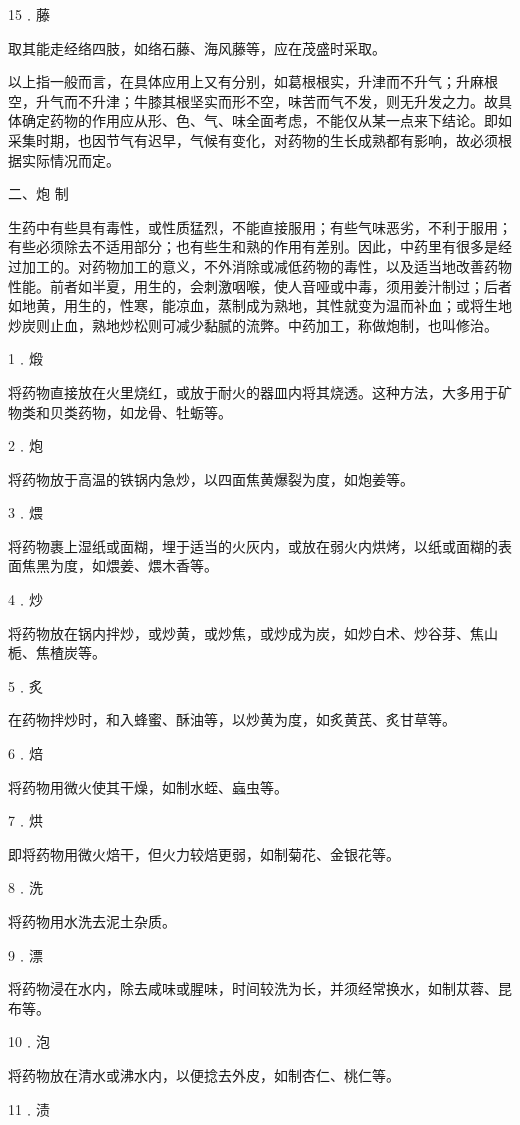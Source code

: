 \documentclass[12pt,UTF8]{ctexbook}
\begin{document}
15﹒藤

取其能走经络四肢，如络石藤、海风藤等，应在茂盛时采取。

以上指一般而言，在具体应用上又有分别，如葛根根实，升津而不升气；升麻根空，升气而不升津；牛膝其根坚实而形不空，味苦而气不发，则无升发之力。故具体确定药物的作用应从形、色、气、味全面考虑，不能仅从某一点来下结论。即如采集时期，也因节气有迟早，气候有变化，对药物的生长成熟都有影响，故必须根据实际情况而定。

二、炮 制

生药中有些具有毒性，或性质猛烈，不能直接服用；有些气味恶劣，不利于服用；有些必须除去不适用部分；也有些生和熟的作用有差别。因此，中药里有很多是经过加工的。对药物加工的意义，不外消除或减低药物的毒性，以及适当地改善药物性能。前者如半夏，用生的，会刺激咽喉，使人音哑或中毒，须用姜汁制过；后者如地黄，用生的，性寒，能凉血，蒸制成为熟地，其性就变为温而补血；或将生地炒炭则止血，熟地炒松则可减少黏腻的流弊。中药加工，称做炮制，也叫修治。

1﹒煅

将药物直接放在火里烧红，或放于耐火的器皿内将其烧透。这种方法，大多用于矿物类和贝类药物，如龙骨、牡蛎等。

2﹒炮

将药物放于高温的铁锅内急炒，以四面焦黄爆裂为度，如炮姜等。

3﹒煨

将药物裹上湿纸或面糊，埋于适当的火灰内，或放在弱火内烘烤，以纸或面糊的表面焦黑为度，如煨姜、煨木香等。

4﹒炒

将药物放在锅内拌炒，或炒黄，或炒焦，或炒成为炭，如炒白术、炒谷芽、焦山栀、焦楂炭等。

5﹒炙

在药物拌炒时，和入蜂蜜、酥油等，以炒黄为度，如炙黄芪、炙甘草等。

6﹒焙

将药物用微火使其干燥，如制水蛭、蝱虫等。

7﹒烘

即将药物用微火焙干，但火力较焙更弱，如制菊花、金银花等。

8﹒洗

将药物用水洗去泥土杂质。

9﹒漂

将药物浸在水内，除去咸味或腥味，时间较洗为长，并须经常换水，如制苁蓉、昆布等。

10﹒泡

将药物放在清水或沸水内，以便捻去外皮，如制杏仁、桃仁等。

11﹒渍
\end{document}
